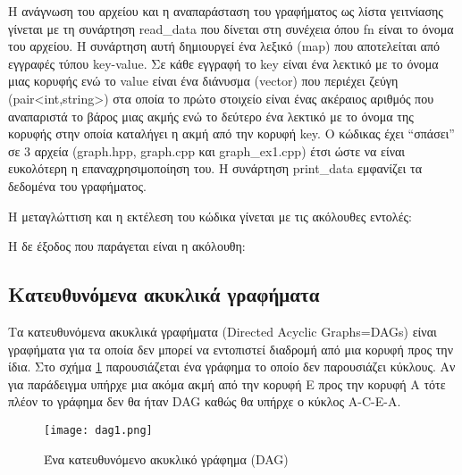 

Η ανάγνωση του αρχείου και η αναπαράσταση του γραφήματος ως λίστα γειτνίασης γίνεται με τη συνάρτηση read\_data που δίνεται στη συνέχεια όπου fn είναι το όνομα του αρχείου. Η συνάρτηση αυτή δημιουργεί ένα λεξικό (map) που αποτελείται από εγγραφές τύπου key-value. Σε κάθε εγγραφή το key είναι ένα λεκτικό με το όνομα μιας κορυφής ενώ το value είναι ένα διάνυσμα (vector) που περιέχει ζεύγη (pair<int,string>) στα οποία το πρώτο στοιχείο είναι ένας ακέραιος αριθμός που αναπαριστά το βάρος μιας ακμής ενώ το δεύτερο ένα λεκτικό με το όνομα της κορυφής στην οποία καταλήγει η ακμή από την κορυφή key. Ο κώδικας έχει ``σπάσει'' σε 3 αρχεία (graph.hpp, graph.cpp και graph\_ex1.cpp) έτσι ώστε να είναι ευκολότερη η επαναχρησιμοποίηση του. Η συνάρτηση print\_data εμφανίζει τα δεδομένα του γραφήματος.







Η μεταγλώττιση και η εκτέλεση του κώδικα γίνεται με τις ακόλουθες εντολές:



Η δε έξοδος που παράγεται είναι η ακόλουθη:



\subsection{Κατευθυνόμενα ακυκλικά γραφήματα}
Τα κατευθυνόμενα ακυκλικά γραφήματα (Directed Acyclic Graphs=DAGs) είναι γραφήματα για τα οποία δεν μπορεί να εντοπιστεί διαδρομή από μια κορυφή προς την ίδια. Στο σχήμα \ref{fig:dag1} παρουσιάζεται ένα γράφημα το οποίο δεν παρουσιάζει κύκλους. Αν για παράδειγμα υπήρχε μια ακόμα ακμή από την κορυφή E προς την κορυφή A τότε πλέον το γράφημα δεν θα ήταν DAG καθώς θα υπήρχε ο κύκλος A-C-E-A.

\begin{figure}[ht]
	\centering
	\texttt{[image: dag1.png]}
	\caption{Ένα κατευθυνόμενο ακυκλικό γράφημα (DAG)}
	\label{fig:dag1}
\end{figure}

